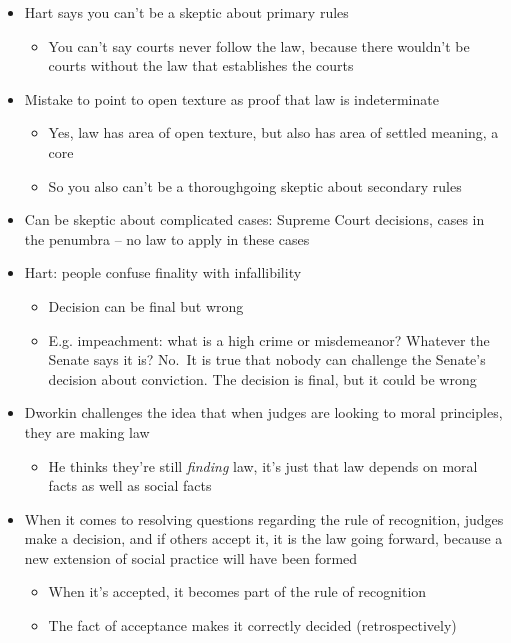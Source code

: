 \begin{itemize}
\tightlist
\item
  Hart says you can't be a skeptic about primary rules

  \begin{itemize}
  \tightlist
  \item
    You can't say courts never follow the law, because there wouldn't be
    courts without the law that establishes the courts
  \end{itemize}
\item
  Mistake to point to open texture as proof that law is indeterminate

  \begin{itemize}
  \tightlist
  \item
    Yes, law has area of open texture, but also has area of settled
    meaning, a core
  \item
    So you also can't be a thoroughgoing skeptic about secondary rules
  \end{itemize}
\item
  Can be skeptic about complicated cases: Supreme Court decisions, cases
  in the penumbra -- no law to apply in these cases
\item
  Hart: people confuse finality with infallibility

  \begin{itemize}
  \tightlist
  \item
    Decision can be final but wrong
  \item
    E.g. impeachment: what is a high crime or misdemeanor? Whatever the
    Senate says it is? No.~It is true that nobody can challenge the
    Senate's decision about conviction. The decision is final, but it
    could be wrong
  \end{itemize}
\item
  Dworkin challenges the idea that when judges are looking to moral
  principles, they are making law

  \begin{itemize}
  \tightlist
  \item
    He thinks they're still \emph{finding} law, it's just that law
    depends on moral facts as well as social facts
  \end{itemize}
\item
  When it comes to resolving questions regarding the rule of
  recognition, judges make a decision, and if others accept it, it is
  the law going forward, because a new extension of social practice will
  have been formed

  \begin{itemize}
  \tightlist
  \item
    When it's accepted, it becomes part of the rule of recognition
  \item
    The fact of acceptance makes it correctly decided (retrospectively)
  \end{itemize}
\end{itemize}

